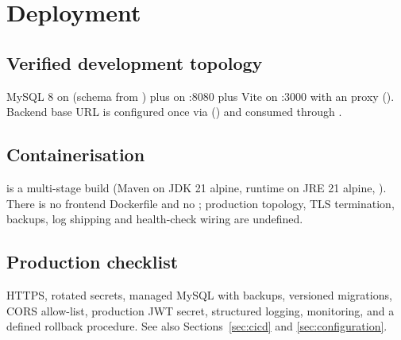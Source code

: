 \section{Deployment}
\label{sec:deployment}

\subsection{Verified development topology}

MySQL 8 on  (schema from ) plus  on :8080 plus Vite on :3000 with an  proxy (). Backend base URL is configured once via  () and consumed through .

\subsection{Containerisation}

 is a multi-stage build (Maven on JDK 21 alpine, runtime on JRE 21 alpine, ). There is no frontend Dockerfile and no ; production topology, TLS termination, backups, log shipping and health-check wiring are undefined.

\subsection{Production checklist}

HTTPS, rotated secrets, managed MySQL with backups, versioned migrations, CORS allow-list, production JWT secret, structured logging, monitoring, and a defined rollback procedure. See also Sections~\ref{sec:cicd} and \ref{sec:configuration}.
